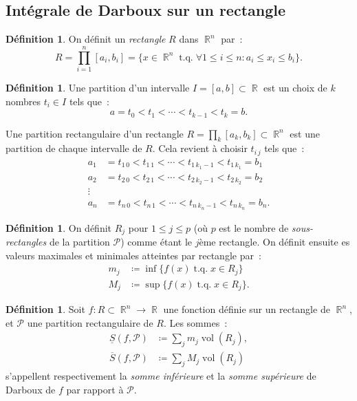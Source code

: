 \documentclass{article}
\DeclareMathOperator{\R}{\mathbb R}
\DeclareMathOperator{\tq}{ t.q. }
\DeclareMathOperator{\vol}{vol}
\theoremstyle{definition}
\newtheorem{déf}[thm]{Définition}
\theoremstyle{remark}
\begin{document}
	\subsection{Intégrale de Darboux sur un rectangle}
		\begin{déf} On définit un \emph{rectangle} $R$ dans $\R^n$ par~:
		\[R = \prod_{i=1}^n[a_i, b_i] = \{x \in \R^n \tq \forall 1 \leq i \leq n : a_i \leq x_i \leq b_i\}.\]
		\end{déf}

		\begin{déf} Une partition d'un intervalle $I = [a, b] \subset \R$ est un choix de $k$ nombres $t_i \in I$ tels que~:
		\[a = t_0 < t_1 < \dotsb < t_{k-1} < t_k = b.\]

		Une partition rectangulaire d'un rectangle $R = \prod_k[a_k, b_k] \subset \R^n$ est une partition de chaque intervalle de $R$.
		Cela revient à choisir $t_{i\,j}$ tels que~:
		\begin{align*}
			a_1 &= t_{1\,0} < t_{1\,1} < \dotsb < t_{1\,k_1-1} < t_{1\,k_1} = b_1 \\
			a_2 &= t_{2\,0} < t_{2\,1} < \dotsb < t_{2\,k_2-1} < t_{2\,k_2} = b_2 \\
			\vdots \\
			a_n &= t_{n\,0} < t_{n\,1} < \dotsb < t_{n\,k_n-1} < t_{n\,k_n} = b_n.
		\end{align*}
		\end{déf}

		\begin{déf} On définit $R_j$ pour $1 \leq j \leq p$ (où $p$ est le nombre de \emph{sous-rectangles} de la partition $\mathcal P$) comme étant le $j$ème
		rectangle. On définit ensuite es valeurs maximales et minimales atteintes par rectangle par~:
		\begin{align*}
			m_j &\coloneqq \inf\{f(x) \tq x \in R_j\} \\
			M_j &\coloneqq \sup\{f(x) \tq x \in R_j\}.
		\end{align*}
		\end{déf}

		\begin{déf} Soit $f : R \subset \R^n \to \R$ une fonction définie sur un rectangle de $\R^n$, et $\mathcal P$ une partition rectangulaire de $R$. Les
		sommes~:
		\begin{align*}
			\underline S(f, \mathcal P) &\coloneqq \sum_jm_j\vol(R_j), \\
			\overline  S(f, \mathcal P) &\coloneqq \sum_jM_j\vol(R_j)
		\end{align*}
		s'appellent respectivement la \emph{somme inférieure} et la \emph{somme supérieure} de Darboux de $f$ par rapport à $\mathcal P$.
		\end{déf}
\end{document}
